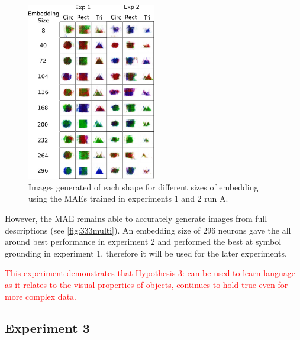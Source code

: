 \begin{figure}[h]
\centering
\includegraphics[width=0.5\textwidth]{Figs/shapes/shapes331v333.png}
\caption{Images generated of each shape for different sizes of embedding using the \acp{MAE} trained in experiments 1 and 2 run A.}
\label{fig:shapes333v331}
\end{figure} %
However, the \ac{MAE} remains able to accurately generate images from full descriptions (see \autoref{fig:333multi}). 
An embedding size of 296 neurons gave the all around best performance in experiment 2 and performed the best at symbol grounding in experiment 1, therefore it will be used for the later experiments.

\textcolor{red}{This experiment demonstrates that Hypothesis 3: can be used to learn language as it relates to the visual properties of objects, continues to hold true even for more complex data.}

\newpage
\subsection{Experiment 3}


